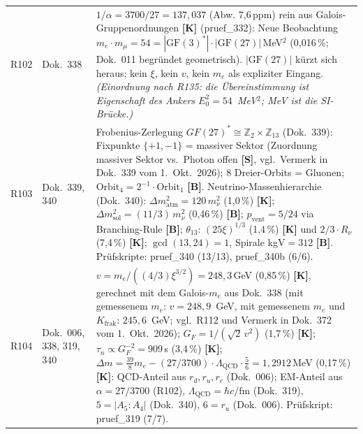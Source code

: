 \begin{longtable}{@{}p{0.9cm}p{3.1cm}p{10.2cm}@{}}
R102 & Dok.~338 & $1/\alpha = 3700/27 = 137{,}037$ (Abw. 7{,}6\,ppm) rein aus Galois-Gruppenordnungen \textbf{[K]} (pruef\_332): Neue Beobachtung $m_e\cdot m_\mu = 54 = |\text{GF}(3)^*|\cdot|\text{GF}(27)|$\,MeV$^2$ (0{,}016\,\%; Dok.~011 begründet geometrisch). $|\text{GF}(27)|$ kürzt sich heraus; kein $\xi$, kein $v$, kein $m_e$ als expliziter Eingang. \emph{(Einordnung nach R135: die Übereinstimmung ist Eigenschaft des Ankers $E_0^2=54$~MeV$^2$; MeV ist die SI-Brücke.)} \\
R103 & Dok.~339, 340 & Frobenius-Zerlegung $GF(27)^*\cong\mathbb{Z}_2\times\mathbb{Z}_{13}$ (Dok.~339): Fixpunkte $\{+1,-1\}$ = massiver Sektor (Zuordnung massiver Sektor vs.\ Photon offen \textbf{[S]}, vgl.\ Vermerk in Dok.~339 vom 1.~Okt.~2026); 8 Dreier-Orbits = Gluonen; $\text{Orbit}_4 = 2^{-1}\cdot\text{Orbit}_1$ \textbf{[B]}. Neutrino-Massenhierarchie (Dok.~340): $\Delta m^2_\text{atm}=120\,m_\nu^2$ (1{,}0\,\%) \textbf{[K]}; $\Delta m^2_\text{sol}=(11/3)\,m_\nu^2$ (0{,}46\,\%) \textbf{[B]}; $p_\text{vent}=5/24$ via Branching-Rule \textbf{[B]}; $\theta_{13}$: $(25\xi)^{1/3}$ (1{,}4\,\%) \textbf{[K]} und $2/3\cdot R_\nu$ (7{,}4\,\%) \textbf{[K]}; $\gcd(13,24)=1$, Spirale kgV$=312$ \textbf{[B]}. Prüfskripte: pruef\_340 (13/13), pruef\_340b (6/6). \\
R104 & Dok.~006, 338, 319, 340 & $v=m_e/((4/3)\xi^{3/2})=248{,}3$\,GeV (0{,}85\,\%) \textbf{[K]}, gerechnet mit dem Galois-$m_e$ aus Dok.~338 (mit gemessenem $m_e$: $v=248{,}9$~GeV, mit gemessenem $m_e$ und $K_{\mathrm{frak}}$: $245{,}6$~GeV; vgl.\ R112 und Vermerk in Dok.~372 vom 1.~Okt.~2026); $G_F=1/(\sqrt{2}\,v^2)$ (1{,}7\,\%) \textbf{[K]}; $\tau_n\propto G_F^{-2}=909$\,s (3{,}4\,\%) \textbf{[K]}; $\Delta m=\frac{39}{8}m_e-(27/3700)\cdot\Lambda_\text{QCD}\cdot\frac{5}{6}=1{,}2912$\,MeV (0{,}17\,\%) \textbf{[K]}: QCD-Anteil aus $r_d,r_u,r_e$ (Dok.~006); EM-Anteil aus $\alpha=27/3700$ (R102), $\Lambda_\text{QCD}=\hbar c/\mathrm{fm}$ (Dok.~319), $5=|A_5:A_4|$ (Dok.~340), $6=r_u$ (Dok.~006). Prüfskript: pruef\_319 (7/7). \\

\end{longtable}
